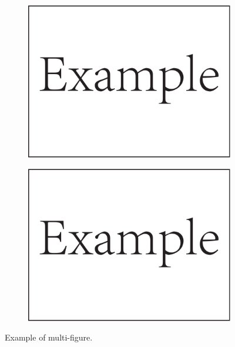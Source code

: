 \begin{figure}[!htb]
\begin{subfigure}[b]{0.45\linewidth}
		\includegraphics[width=\linewidth]{Figures/Example.pdf}
		\caption{}
		\label{fig:2:2c}
	\end{subfigure}
	\hfil
	\begin{subfigure}[b]{0.45\linewidth}
		\includegraphics[width=\linewidth]{Figures/Example.pdf}
		\caption{}
		\label{fig:2:2d}
	\end{subfigure}
	\caption{Example of multi-figure.}
	\label{fig:2:2}
\end{figure}